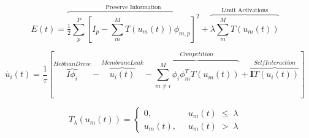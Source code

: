 \documentclass[smallextended]{svjour3}       %
\newcommand{\argmin}{\operatornamewithlimits{argmin}}
\begin{document}
%

\begin{equation}
    E(t) = \overbrace{ \tfrac{1}{2} \sum\limits_{p}^{P} \left[ I_{p} - \sum\limits_{m}^{M}T(u_{m}(t)) \phi_{m,p} \right]^{2}}^\text{Preserve Information} +
    \overbrace{ \lambda \sum\limits_{m}^{M} T(u_{m}(t)) }^\text{Limit Activations}
\label{indexenergyfunc}
\end{equation}

\begin{equation}
    \dot{u_{i}}(t) = \frac{1}{\tau} \left[ \overbrace{ I\phi_{i} }^{Hebbian Drive} - \overbrace{ u_{i}(t) }^{Membrane Leak} -
    \overbrace{ \sum_{m \neq i}^{M}\phi_{i}\phi_{m}^T T(u_{m}(t)) }^{Competition} +
    \overbrace { \mathbf{I}T(u_{i}(t)) }^{Self Interaction} \right]
\label{lcaupdate}
\end{equation}

\begin{equation}
    T_{\lambda}(u_{m}(t)) = \left\{
    \begin{aligned}
        0,\;\; &u_{m}(t)\; \leq\; \lambda \\
        u_{m}(t),\;\; &u_{m}(t)\; >\; \lambda
    \end{aligned}
    \right.
\label{thresholdfunc}
\end{equation}


\end{document}
